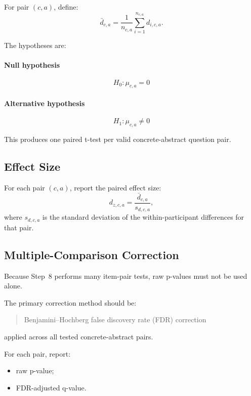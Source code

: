 \documentclass[11pt]{article}
\begin{document}
For pair \((c,a)\), define:
\begin{equation}
\bar{d}_{c,a} = \frac{1}{n_{c,a}} \sum_{i=1}^{n_{c,a}} d_{i,c,a}.
\end{equation}

The hypotheses are:

\paragraph{Null hypothesis}
\begin{equation}
H_0: \mu_{c,a} = 0
\end{equation}

\paragraph{Alternative hypothesis}
\begin{equation}
H_1: \mu_{c,a} \neq 0
\end{equation}

This produces one paired t-test per valid concrete-abstract question pair.

\subsection{Effect Size}
For each pair \((c,a)\), report the paired effect size:
\begin{equation}
d_{z,c,a} = \frac{\bar{d}_{c,a}}{s_{d,c,a}},
\end{equation}
where \(s_{d,c,a}\) is the standard deviation of the within-participant differences for that pair.

\subsection{Multiple-Comparison Correction}
Because Step~8 performs many item-pair tests, raw p-values must not be used alone.

The primary correction method should be:
\begin{quote}
Benjamini--Hochberg false discovery rate (FDR) correction
\end{quote}
applied across all tested concrete-abstract pairs.

For each pair, report:
\begin{itemize}
    \item raw p-value;
    \item FDR-adjusted q-value.
\end{itemize}
\end{document}
